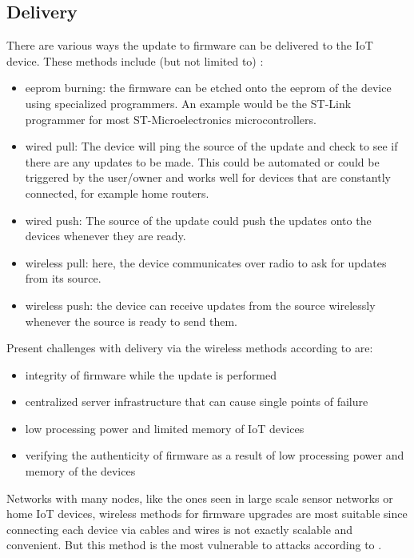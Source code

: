 \documentclass{article}
\begin{document}
\subsection{Delivery}
There are various ways the update to firmware can be delivered to the IoT device. These methods include (but not limited to) \cite{nhtsa}:

\begin{itemize}
    \item eeprom burning: the firmware can be etched onto the eeprom of the device using specialized programmers. An example would be the ST-Link programmer for most ST-Microelectronics microcontrollers.
    \item wired pull: The device will ping the source of the update and check to see if there are any updates to be made. This could be automated or could be triggered by the user/owner and works well for devices that are constantly connected, for example home routers.
    \item wired push: The source of the update could push the updates onto the devices whenever they are ready.
    \item wireless pull: here, the device communicates over radio to ask for updates from its source.
    \item wireless push: the device can receive updates from the source wirelessly whenever the source is ready to send them.
\end{itemize}

Present challenges with delivery via the wireless methods according to \cite{blockchainupdate} are:

\begin{itemize}
    \item integrity of firmware while the update is performed
    \item centralized server infrastructure that can cause single points of failure
    \item low processing power and limited memory of IoT devices
    \item verifying the authenticity of firmware as a result of low processing power and memory of the devices
\end{itemize}

Networks with many nodes, like the ones seen in large scale sensor networks or home IoT devices, wireless methods for firmware upgrades are most suitable since connecting each device via cables and wires is not exactly scalable and convenient. But this method is the most vulnerable to attacks according to \cite{otaupdate}.
\end{document}
